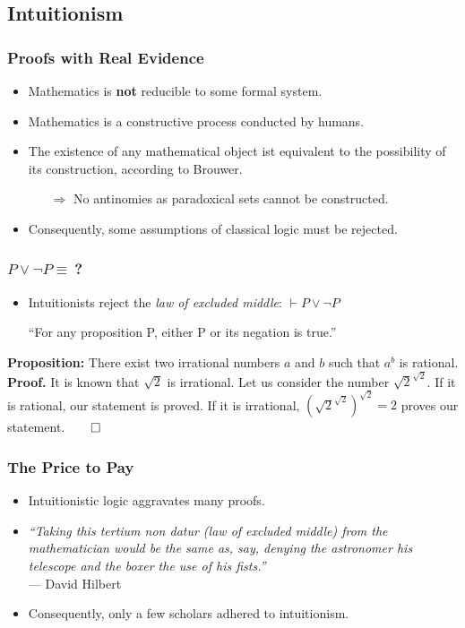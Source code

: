 \documentclass{beamer}
\begin{document}
\subsection{Intuitionism}
\begin{frame}
    \frametitle{Proofs with Real Evidence}
    \begin{itemize}[<+->]
	\item Mathematics is \textbf{not} reducible to some formal system.
	\item Mathematics is a constructive process conducted by humans.
	\item The existence of any mathematical object ist equivalent to the possibility of its construction, according to Brouwer.
	\begin{itemize}
		\item[$\Rightarrow$] No antinomies as paradoxical sets cannot be constructed.
	\end{itemize}
	\item Consequently, some assumptions of classical logic must be rejected.
    \end{itemize}
\end{frame}
\begin{frame}
    \frametitle{$P\lor\lnot P\equiv\ $?}
    \begin{itemize}[<+->]
	\item Intuitionists reject the \textit{law of excluded middle}: $\vdash P\lor\lnot P$\\
		\begin{centering}
			``For any proposition P, either P or its negation is true.''
		\end{centering}
    \end{itemize}
	\pause[\thebeamerpauses]
	\textbf{Proposition:} There exist two irrational numbers $a$ and $b$ such that $a^b$ is rational.\\\pause
	\vspace{\baselineskip}
	\textbf{Proof.} It is known that $\sqrt{2}$ is irrational. Let us consider the number $\sqrt{2}^{\sqrt{2}}$.\pause$ $ If it is rational, our statement is proved.\pause$ $ If it is irrational, $(\sqrt{2}^{\sqrt{2}})^{\sqrt{2}}=2$ proves our statement.\hfill$\qed$
\end{frame}
\begin{frame}
    \frametitle{The Price to Pay}
    \begin{itemize}[<+->]
	\item Intuitionistic logic aggravates many proofs.
	\item \textit{``Taking this tertium non datur (law of excluded middle) from the mathematician would be the same as, say, denying the astronomer his telescope and the boxer the use of his fists.''}\nocite{hilbert_tertium_non_datur}\\\hfill--- David Hilbert
	\item Consequently, only a few scholars adhered to intuitionism.
    \end{itemize}
\end{frame}
\end{document}
